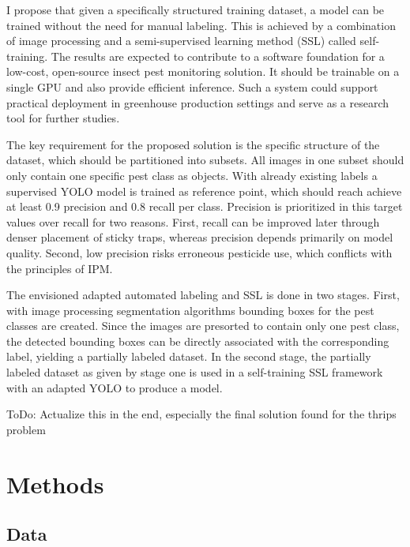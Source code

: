 \documentclass[12pt,a4paper]{article}
\begin{document}
 I propose that given a specifically structured training dataset, a model can be trained without the need for manual labeling. This is achieved by a combination of image processing and a semi-supervised learning method (SSL) called self-training. The results are expected to contribute to a software foundation for a low-cost, open-source insect pest monitoring solution. It should be trainable on a single GPU and also provide efficient inference. Such a system could support practical deployment in greenhouse production settings and serve as a research tool for further studies.
 
 The key requirement for the proposed solution is the specific structure of the dataset, which should be partitioned into subsets. All images in one subset should only contain one specific pest class as objects. With already existing labels a supervised YOLO model is trained as reference point, which should reach achieve at least 0.9 precision and 0.8 recall per class. Precision is prioritized in this target values over recall for two reasons. First, recall can be improved later through denser placement of sticky traps, whereas precision depends primarily on model quality. Second, low precision risks erroneous pesticide use, which conflicts with the principles of IPM. 
 
The envisioned adapted automated labeling and SSL is done in two stages. First, with image processing segmentation algorithms bounding boxes for the pest classes are created. Since the images are presorted to contain only one pest class, the detected bounding boxes can be directly associated with the corresponding label, yielding a partially labeled dataset. In the second stage, the partially labeled dataset as given by stage one is used in a self-training SSL framework with an adapted YOLO to produce a model.

{\color{red} ToDo: Actualize this in the end, especially the final solution found for the thrips problem}

\section {Methods}

\subsection{Data}
\end{document}
